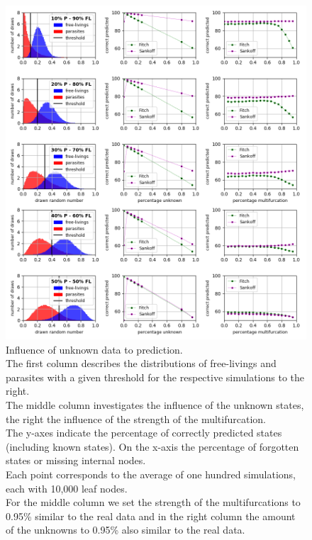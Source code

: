     \begin{figure}
      \centering
      \includegraphics[trim = 0mm 0mm 0mm 150mm, clip, width=\textwidth]{Figures/simulation_evaluation_1.png}
      \caption{Influence of unknown data to prediction. \\
        The first column describes the distributions of free-livings and parasites with a given 
          threshold for the respective simulations to the right. \\
        The middle column investigates the influence of the unknown states, the right the influence of
          the strength of the multifurcation. \\
        The y-axes indicate the percentage of correctly predicted states (including known states). On 
          the x-axis the percentage of forgotten states or missing internal nodes. \\
        Each point corresponds to the average of one hundred simulations, each with 10,000 leaf nodes. \\
        For the middle column we set the strength of the multifurcations to 0.95\% similar to the 
          real data and in the right column the amount of the unknowns to 0.95\% also similar to the 
          real data.}
      \label{fig:influence of unknown data}
    \end{figure}
